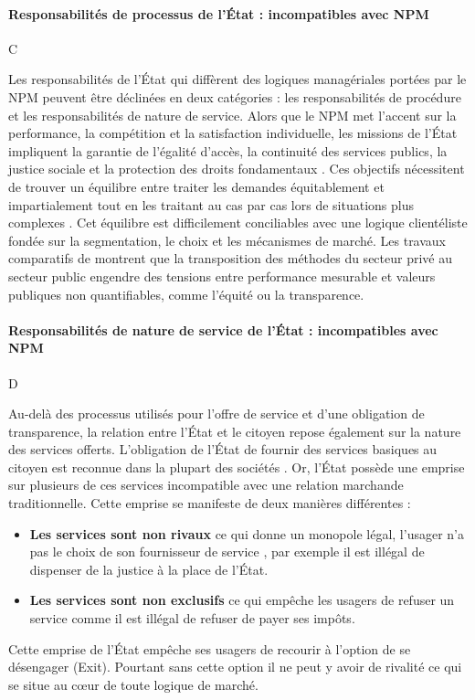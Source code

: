\documentclass[a4paper,12pt, openany]{book}
\begin{document}
\paragraph{Responsabilités de processus de l'État : incompatibles avec NPM} C

Les responsabilités de l’État qui diffèrent des logiques managériales portées par le NPM peuvent être déclinées en deux catégories : les responsabilités de procédure et les responsabilités de nature de service. Alors que le NPM met l’accent sur la performance, la compétition et la satisfaction individuelle, les missions de l’État impliquent la garantie de l’égalité d’accès, la continuité des services publics, la justice sociale et la protection des droits fondamentaux \parencite{hood91, haque99}. Ces objectifs nécessitent de trouver un équilibre entre traiter les demandes équitablement et impartialement tout en les traitant au cas par cas lors de situations plus complexes \parencite{brewer07}. Cet équilibre est difficilement conciliables avec une logique clientéliste fondée sur la segmentation, le choix et les mécanismes de marché. Les travaux comparatifs de \textcite{pollitt11} montrent que la transposition des méthodes du secteur privé au secteur public engendre des tensions entre performance mesurable et valeurs publiques non quantifiables, comme l’équité ou la transparence. 

\paragraph{Responsabilités de nature de service de l'État : incompatibles avec NPM} D

Au-delà des processus utilisés pour l'offre de service et d'une obligation de transparence, la relation entre l'État et le citoyen repose également sur la nature des services offerts. L'obligation de l'État de fournir des services basiques au citoyen est reconnue dans la plupart des sociétés \parencite{haque99}. Or, l'État possède une emprise sur plusieurs de ces services incompatible avec une relation marchande traditionnelle. Cette emprise se manifeste de deux manières différentes :
\begin{itemize}
	\item \textbf{Les services sont non rivaux} ce qui donne un monopole légal, l'usager n'a pas le choix de son fournisseur de service \parencite{christensen02}, par exemple il est illégal de dispenser de la justice à la place de l'État.
	\item \textbf{Les services sont non exclusifs} ce qui empêche les usagers de refuser un service comme il est illégal de refuser de payer ses impôts.
\end{itemize}
Cette emprise de l'État empêche ses usagers de recourir à l'option de se désengager (Exit). Pourtant sans cette option il ne peut y avoir de rivalité ce qui se situe au cœur de toute logique de marché.
\end{document}
